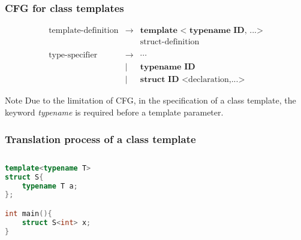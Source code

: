 \documentclass{beamer}
\begin{document}
\begin{frame}
    \frametitle{CFG for class templates}

    \begin{eqnarray*}
        \text{template-definition} & \rightarrow & \textbf{template} \textbf{ < typename ID, ...>} \\
        &  & \text{struct-definition}\\
        \\
        \text{type-specifier} & \rightarrow & \cdots \\
        & | & \textbf{typename ID} \\
        & | & \textbf{struct ID <}\text{declaration,...}\textbf{>}
    \end{eqnarray*}

    \begin{block}{Note}
        \small
        Due to the limitation of CFG, in the specification of a class template, the keyword \textit{typename} is required before a template parameter.
    \end{block}

\end{frame}

\begin{frame}[fragile]
    \frametitle{Translation process of a class template}

    \begin{columns}
        \begin{column}[]{0.5\textwidth}
            \small
            \begin{lstlisting}[language=C++]
template<typename T>
struct S{
    typename T a;
};

int main(){
    struct S<int> x;
}
                \end{lstlisting}
        \end{column}

    \end{columns}

\end{frame}
\end{document}
